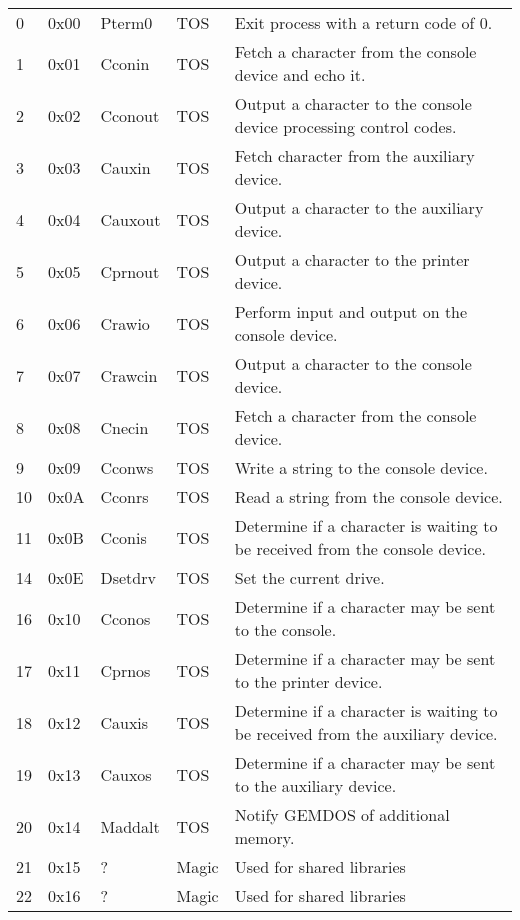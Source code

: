 \documentclass[a4paper]{article}
\begin{document}
\begin{supertabular}{|p{0.6cm}|p{1cm}|p{2cm}|p{1cm}|p{10cm}|}
0       & 0x00  & Pterm0      & TOS   & Exit process with a return code of 0. \\
1       & 0x01  & Cconin      & TOS   & Fetch a character from the console device and echo it. \\
2       & 0x02  & Cconout     & TOS   & Output a character to the console device processing control codes. \\
3       & 0x03  & Cauxin      & TOS   & Fetch character from the auxiliary device. \\
4       & 0x04  & Cauxout     & TOS   & Output a character to the auxiliary device. \\
5       & 0x05  & Cprnout     & TOS   & Output a character to the printer device. \\
6       & 0x06  & Crawio      & TOS   & Perform input and output on the console device. \\
7       & 0x07  & Crawcin     & TOS   & Output a character to the console device. \\
8       & 0x08  & Cnecin      & TOS   & Fetch a character from the console device. \\
9       & 0x09  & Cconws      & TOS   & Write a string to the console device. \\
10      & 0x0A  & Cconrs      & TOS   & Read a string from the console device. \\
11      & 0x0B  & Cconis      & TOS   & Determine if a character is waiting to be received from the console device. \\
14      & 0x0E  & Dsetdrv     & TOS   & Set the current drive. \\
16      & 0x10  & Cconos      & TOS   & Determine if a character may be sent to the console. \\
17      & 0x11  & Cprnos      & TOS   & Determine if a character may be sent to the printer device. \\
18      & 0x12  & Cauxis      & TOS   & Determine if a character is waiting to be received from the auxiliary device. \\
19      & 0x13  & Cauxos      & TOS   & Determine if a character may be sent to the auxiliary device. \\
20      & 0x14  & Maddalt     & TOS   & Notify GEMDOS of additional memory. \\
21      & 0x15  & ?             & Magic & Used for shared libraries \\
22      & 0x16  & ?             & Magic & Used for shared libraries \\

\end{supertabular}
\end{document}
